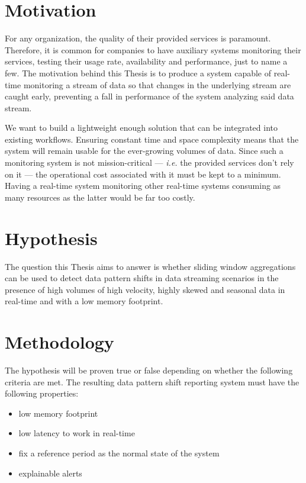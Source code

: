 \section{Motivation} \label{sec:motivation}
For any organization, the quality of their provided services is paramount. Therefore, it is common for companies to have auxiliary systems monitoring their services, testing their usage rate, availability and performance, just to name a few. The motivation behind this Thesis is to produce a system capable of real-time monitoring a stream of data so that changes in the underlying stream are caught early, preventing a fall in performance of the system analyzing said data stream. 

We want to build a lightweight enough solution that can be integrated into existing workflows. Ensuring constant time and space complexity means that the system will remain usable for the ever-growing volumes of data. Since such a monitoring system is not mission-critical --- \textit{i.e.} the provided services don't rely on it --- the operational cost associated with it must be kept to a minimum. Having a real-time system monitoring other real-time systems consuming as many resources as the latter would be far too costly.

\section{Hypothesis} \label{sec:hypothesis}
The question this Thesis aims to answer is whether sliding window aggregations can be used to detect data pattern shifts in data streaming scenarios in the presence of high volumes of high velocity, highly skewed and seasonal data in real-time and with a low memory footprint.

\section{Methodology} \label{sec:methodology}

The hypothesis will be proven true or false depending on whether the following criteria are met. The resulting data pattern shift reporting system must have the following properties:
\begin{itemize}
    \item low memory footprint
    
    \item low latency to work in real-time
    
    \item fix a reference period as the normal state of the system
    
    \item explainable alerts
\end{itemize}

